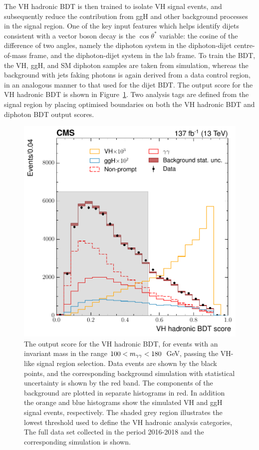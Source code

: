The VH hadronic BDT is then trained to isolate VH signal events, and subsequently reduce the contribution from ggH and other background processes in the signal region. One of the key input features which helps identify dijets consistent with a vector boson decay is the $\cos{\theta^*}$ variable: the cosine of the difference of two angles, namely the diphoton system in the diphoton-dijet centre-of-mass frame, and the diphoton-dijet system in the lab frame. To train the BDT, the VH, ggH, and SM diphoton samples are taken from simulation, whereas the background with jets faking photons is again derived from a data control region, in an analogous manner to that used for the dijet BDT. The output score for the VH hadronic BDT is shown in Figure~\ref{fig:categorisation_vhhad}. Two analysis tags are defined from the signal region by placing optimised boundaries on both the VH hadronic BDT and diphoton BDT output scores. 

\begin{figure}[htb!]
  \centering
  \includegraphics[width=.5\textwidth]{Figures/hgg_overview/VHhadBDT_DD_VH_had_mvascore_no_stack.pdf}
  \caption[VH hadronic BDT output score]
  {
    The output score for the VH hadronic BDT, for events with an invariant mass in the range $100<m_{\gamma\gamma}<180$~GeV, passing the VH-like signal region selection. Data events are shown by the black points, and the corresponding background simulation with statistical uncertainty is shown by the red band. The components of the background are plotted in separate histograms in red. In addition the orange and blue histograms show the simulated VH and ggH signal events, respectively. The shaded grey region illustrates the lowest threshold used to define the VH hadronic analysis categories, The full data set collected in the period 2016-2018 and the corresponding simulation is shown.
  }
  \label{fig:categorisation_vhhad}
\end{figure}

